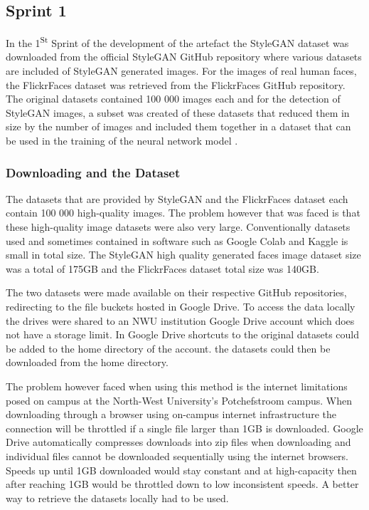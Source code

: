 \subsection{Sprint 1}

In the 1\textsuperscript{St} Sprint of the development of the artefact the StyleGAN dataset was downloaded from the official StyleGAN GitHub repository where various datasets are included of StyleGAN generated images. For the images of real human faces, the FlickrFaces dataset was retrieved from the FlickrFaces GitHub repository. The original datasets contained 100 000 images each and for the detection of StyleGAN images, a subset was created of these datasets that reduced them in size by the number of images and included them together in a dataset that can be used in the training of the neural network model \citep{Karras2019}.

\subsubsection{Downloading and the Dataset}

The datasets that are provided by StyleGAN and the FlickrFaces dataset each contain 100 000 high-quality images. The problem however that was faced is that these high-quality image datasets were also very large. Conventionally datasets used and sometimes contained in software such as Google Colab and Kaggle is small in total size. The StyleGAN high quality generated faces image dataset size was a total of 175GB and the FlickrFaces dataset total size was 140GB. 

The two datasets were made available on their respective GitHub repositories, redirecting to the file buckets hosted in Google Drive. To access the data locally the drives were shared to an NWU institution Google Drive account which does not have a storage limit. In Google Drive shortcuts to the original datasets could be added to the home directory of the account. the datasets could then be downloaded from the home directory.

The problem however faced when using this method is the internet limitations posed on campus at the North-West University's Potchefstroom campus. When downloading through a browser using on-campus internet infrastructure the connection will be throttled if a single file larger than 1GB is downloaded. Google Drive automatically compresses downloads into zip files when downloading and individual files cannot be downloaded sequentially using the internet browsers. Speeds up until 1GB downloaded would stay constant and at high-capacity then after reaching 1GB would be throttled down to low inconsistent speeds. A better way to retrieve the datasets locally had to be used.

